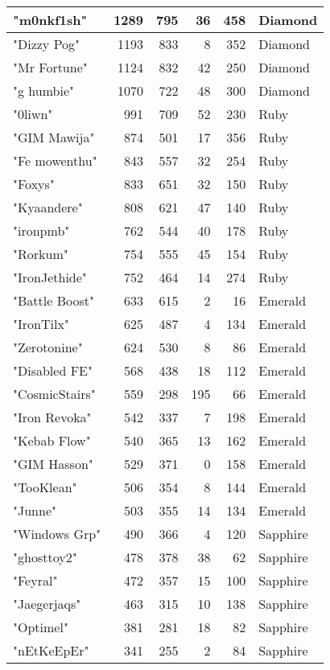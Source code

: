 \documentclass{article}
\begin{document}
\begin{table}[htbp]
\begin{tabular}{|l|r|r|r|r|l|}
"m0nkf1sh" & 1289 & 795 & 36 & 458 & Diamond \\ \hline
"Dizzy Pog" & 1193 & 833 & 8 & 352 & Diamond \\ \hline
"Mr Fortune" & 1124 & 832 & 42 & 250 & Diamond \\ \hline
"g humbie" & 1070 & 722 & 48 & 300 & Diamond \\ \hline
"0liwn" & 991 & 709 & 52 & 230 & Ruby \\ \hline
"GIM Mawija" & 874 & 501 & 17 & 356 & Ruby \\ \hline
"Fe mowenthu" & 843 & 557 & 32 & 254 & Ruby \\ \hline
"Foxys" & 833 & 651 & 32 & 150 & Ruby \\ \hline
"Kyaandere" & 808 & 621 & 47 & 140 & Ruby \\ \hline
"ironpmb" & 762 & 544 & 40 & 178 & Ruby \\ \hline
"Rorkum" & 754 & 555 & 45 & 154 & Ruby \\ \hline
"IronJethide" & 752 & 464 & 14 & 274 & Ruby \\ \hline
"Battle Boost" & 633 & 615 & 2 & 16 & Emerald \\ \hline
"IronTilx" & 625 & 487 & 4 & 134 & Emerald \\ \hline
"Zerotonine" & 624 & 530 & 8 & 86 & Emerald \\ \hline
"Disabled FE" & 568 & 438 & 18 & 112 & Emerald \\ \hline
"CosmicStairs" & 559 & 298 & 195 & 66 & Emerald \\ \hline
"Iron Revoka" & 542 & 337 & 7 & 198 & Emerald \\ \hline
"Kebab Flow" & 540 & 365 & 13 & 162 & Emerald \\ \hline
"GIM Hasson" & 529 & 371 & 0 & 158 & Emerald \\ \hline
"TooKlean" & 506 & 354 & 8 & 144 & Emerald \\ \hline
"Junne" & 503 & 355 & 14 & 134 & Emerald \\ \hline
"Windows Grp" & 490 & 366 & 4 & 120 & Sapphire \\ \hline
"ghosttoy2" & 478 & 378 & 38 & 62 & Sapphire \\ \hline
"Feyral" & 472 & 357 & 15 & 100 & Sapphire \\ \hline
"Jaegerjaqs" & 463 & 315 & 10 & 138 & Sapphire \\ \hline
"Optimel" & 381 & 281 & 18 & 82 & Sapphire \\ \hline
"nEtKeEpEr" & 341 & 255 & 2 & 84 & Sapphire \\ \hline

\end{tabular}
\end{table}
\end{document}
